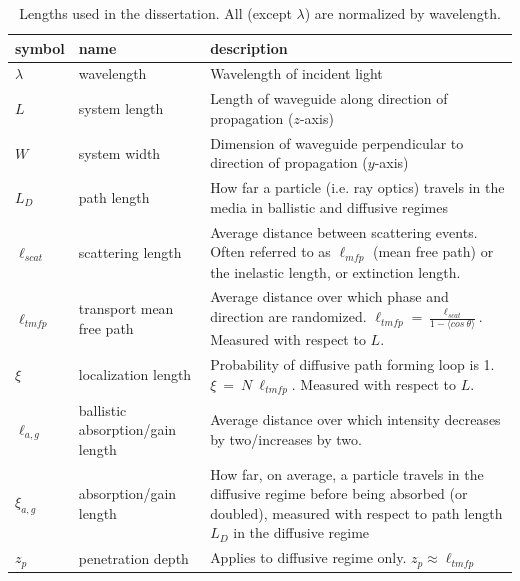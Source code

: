 \newpage
\begin{center}
\begin{table} %
\begin{tabular}{|l|l|p{6cm}|}
\hline symbol & name & description \\ \hline
$\lambda$ & wavelength & Wavelength of incident light \\ 
$L$ &  system length & Length of waveguide along direction of propagation ($z$-axis) \\ 
$W$ & system width & Dimension of waveguide perpendicular to direction of propagation ($y$-axis) \\
$L_D$ & path length & How far a particle (i.e. ray optics) travels in the media in ballistic and diffusive regimes \\
$\ell_{scat}$ & scattering length & Average distance between scattering events. Often referred to as $\ell_{mfp}$ (mean free path) or the inelastic length\cite{1984_John_prl}, or extinction length\cite{1999_van_Tiggelen}. \\ 
$\ell_{tmfp}$ & transport mean free path & Average distance over which phase and direction are randomized.  $\ell_{tmfp} = \frac{\ell_{scat}}{1-\langle cos\ \theta \rangle}$. Measured with respect to $L$. \\ 
$\xi$ & localization length & Probability of diffusive path forming loop is 1.  $\xi~=~N~\ell_{tmfp}$. Measured with respect to $L$. \\ 
$\ell_{a,g}$ & ballistic absorption/gain length & Average distance over which intensity decreases by two/increases by two. \\
$\xi_{a,g}$ & absorption/gain length & How far, on average, a particle travels in the diffusive regime before being absorbed (or doubled), measured with respect to path length $L_D$ in the diffusive regime \\ 
$z_p$ & penetration depth & Applies to diffusive regime only. $z_p \approx \ell_{tmfp}$ \\ \hline
\end{tabular}
\label{tabl:lengths}
\caption{Lengths used in the dissertation. All (except $\lambda$) are normalized by wavelength.} %
\end{table}
\end{center}